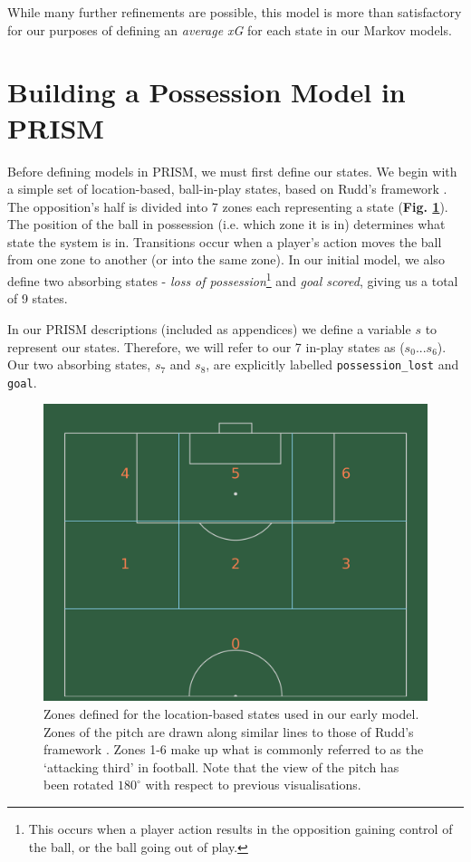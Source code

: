 \documentclass{l4proj}
\begin{document}
While many further refinements are possible, this model is more than satisfactory for our purposes of defining an \textit{average xG} for each state in our Markov models.

\section{Building a Possession Model in PRISM}

Before defining models in PRISM, we must first define our states. We begin with a simple set of location-based, ball-in-play states, based on Rudd's framework \cite{rudd1}. The opposition's half is divided into 7 zones each representing a state (\textbf{Fig. \ref{fig:zooones}}). The position of the ball in possession (i.e. which zone it is in) determines what state the system is in. Transitions occur when a player's action moves the ball from one zone to another (or into the same zone). In our initial model, we also define two absorbing states - \textit{loss of possession}\footnote{This occurs when a player action results in the opposition gaining control of the ball, or the ball going out of play.} and \textit{goal scored}, giving us a total of 9 states.

In our PRISM descriptions (included as appendices) we define a variable $s$ to represent our states. Therefore, we will refer to our 7 in-play states as ($s_0 ... s_6$). Our two absorbing states, $s_7$ and $s_8$, are explicitly labelled \texttt{possession\_lost} and \texttt{goal}.

\begin{figure}[h]
    \centering
    \includegraphics[scale=0.4]{images/states1.png}   
    \caption{Zones defined for the location-based states used in our early model. Zones of the pitch are drawn along similar lines to those of Rudd's framework \cite{rudd1}. Zones 1-6 make up what is commonly referred to as the `attacking third' in football. Note that the view of the pitch has been rotated $180^{\circ}$ with respect to previous visualisations.}
    \label{fig:zooones} 
\end{figure}
\end{document}
